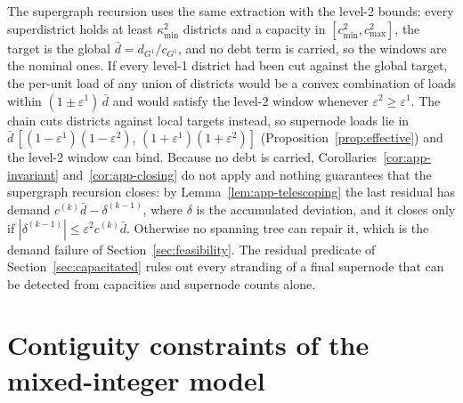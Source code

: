 \documentclass[11pt]{article}
\theoremstyle{definition}
\begin{document}
The supergraph recursion uses the same extraction with the level-2 bounds: every superdistrict holds at least $\kappa^{2}_{\min}$ districts and a capacity in $[c^{2}_{\min}, c^{2}_{\max}]$, the target is the global $\bar d = d_{G^1}/c_{G^1}$, and no debt term is carried, so the windows are the nominal ones. If every level-1 district had been cut against the global target, the per-unit load of any union of districts would be a convex combination of loads within $(1\pm\varepsilon^{1})\,\bar d$ and would satisfy the level-2 window whenever $\varepsilon^{2} \geq \varepsilon^{1}$. The chain cuts districts against local targets instead, so supernode loads lie in $\bar{d}\,[(1-\varepsilon^{1})(1-\varepsilon^{2}),\,(1+\varepsilon^{1})(1+\varepsilon^{2})]$ (Proposition~\ref{prop:effective}) and the level-2 window can bind. Because no debt is carried, Corollaries~\ref{cor:app-invariant} and~\ref{cor:app-closing} do not apply and nothing guarantees that the supergraph recursion closes: by Lemma~\ref{lem:app-telescoping} the last residual has demand $c^{(k)}\bar d - \delta^{(k-1)}$, where $\delta$ is the accumulated deviation, and it closes only if $|\delta^{(k-1)}| \le \varepsilon^2 c^{(k)} \bar d$. Otherwise no spanning tree can repair it, which is the demand failure of Section~\ref{sec:feasibility}. The residual predicate of Section~\ref{sec:capacitated} rules out every stranding of a final supernode that can be detected from capacities and supernode counts alone.

\section{Contiguity constraints of the mixed-integer model}
\label{app:shir}
\end{document}
